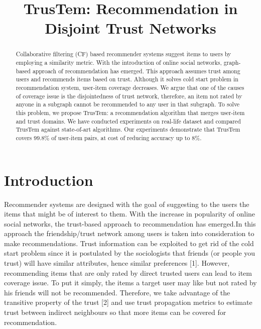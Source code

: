 \documentclass[11pt, conference, onecolumn]{IEEEtran}
\begin{document}
\nocite{*}
\title{TrusTem: Recommendation in Disjoint Trust Networks}

\author{
\and
{}
}

\maketitle

\begin{abstract}
Collaborative filtering (CF) based recommender systems suggest items to users by employing a similarity metric. With the introduction of online social networks, graph-based approach of recommendation has emerged. This approach assumes trust among users and recommends items based on trust. Although it solves cold start problem in recommendation system, user-item coverage decreases. We argue that one of the causes of coverage issue is the disjointedness of trust network, therefore, an item not rated by anyone in a subgraph cannot be recommended to any user in that subgraph. To solve this problem, we propose TrusTem: a recommendation algorithm that merges user-item and trust domains. We have conducted experiments on real-life dataset and compared TrusTem against state-of-art algorithms. Our experiments demonstrate that TrusTem covers $99.8\%$ of user-item pairs, at cost of reducing accuracy up to $8\%$.
\end{abstract}

\section{Introduction} \label{sec:intro}
Recommender systems are designed with the goal of suggesting to the users the items that might be of interest to them. With the increase in popularity of online social networks, the trust-based approach to recommendation has emerged.In this approach the friendship/trust network among users is taken into consideration to make recommendations. Trust information can be exploited to get rid of the cold start problem since it is postulated by the sociologists that friends (or people you trust) will have similar attributes, hence similar preferences [1]. However, recommending items that are only rated by direct trusted users can lead to item coverage issue. To put it simply, the items a target user may like but not rated by his friends will not be recommended. Therefore, we take advantage of the transitive property of the trust [2] and use trust propagation metrics to estimate trust between indirect neighbours so that more items can be covered for recommendation. 
\end{document}
